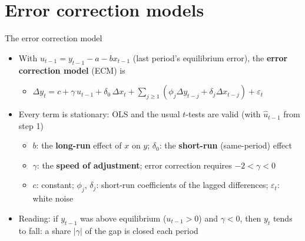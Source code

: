 \section{Error correction models}

\begin{frame}{The error correction model}
\itemsize{\small}
\begin{itemize}
    \item With $u_{t-1} = y_{t-1} - a - b x_{t-1}$ (last period's equilibrium error), the \textbf{error correction model} (ECM) is
    \begin{itemize}
        \item $\Delta y_t = c + \gamma\,u_{t-1} + \delta_0\,\Delta x_t + \sum_{j \ge 1}(\phi_j\Delta y_{t-j} + \delta_j\Delta x_{t-j}) + \varepsilon_t$
    \end{itemize}
    \item Every term is stationary: OLS and the usual $t$-tests are valid (with $\hat u_{t-1}$ from step 1)
    \begin{itemize}
        \item $b$: the \textbf{long-run} effect of $x$ on $y$; $\delta_0$: the \textbf{short-run} (same-period) effect
        \item $\gamma$: the \textbf{speed of adjustment}; error correction requires $-2 < \gamma < 0$
        \item $c$: constant; $\phi_j$, $\delta_j$: short-run coefficients of the lagged differences; $\varepsilon_t$: white noise
    \end{itemize}
    \item Reading: if $y_{t-1}$ was above equilibrium ($u_{t-1} > 0$) and $\gamma < 0$, then $y_t$ tends to fall: a share $|\gamma|$ of the gap is closed each period
\end{itemize}
\end{frame}

